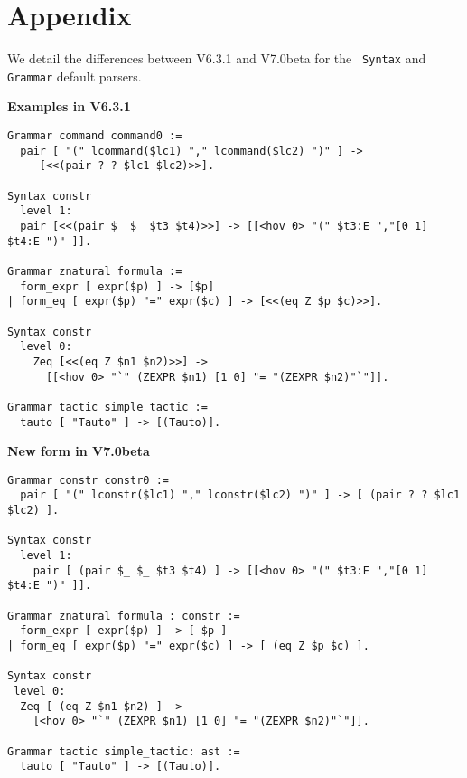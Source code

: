 \documentclass[11pt]{article}
\begin{document}
%
%

\section*{Appendix}
\label{Appendix}
We detail the differences between {\Coq} V6.3.1 and V7.0beta for the {\tt
Syntax} and {\tt Grammar} default parsers.

\medskip

{\bf Examples in V6.3.1}

\begin{verbatim}
Grammar command command0 :=
  pair [ "(" lcommand($lc1) "," lcommand($lc2) ")" ] ->
	 [<<(pair ? ? $lc1 $lc2)>>].

Syntax constr
  level 1:
  pair [<<(pair $_ $_ $t3 $t4)>>] -> [[<hov 0> "(" $t3:E ","[0 1] $t4:E ")" ]].

Grammar znatural formula :=
  form_expr [ expr($p) ] -> [$p]
| form_eq [ expr($p) "=" expr($c) ] -> [<<(eq Z $p $c)>>].

Syntax constr
  level 0:
    Zeq [<<(eq Z $n1 $n2)>>] -> 
      [[<hov 0> "`" (ZEXPR $n1) [1 0] "= "(ZEXPR $n2)"`"]].

Grammar tactic simple_tactic :=
  tauto [ "Tauto" ] -> [(Tauto)].
\end{verbatim}

\medskip

{\bf New form in V7.0beta}

\begin{verbatim}
Grammar constr constr0 :=
  pair [ "(" lconstr($lc1) "," lconstr($lc2) ")" ] -> [ (pair ? ? $lc1 $lc2) ].

Syntax constr
  level 1:
    pair [ (pair $_ $_ $t3 $t4) ] -> [[<hov 0> "(" $t3:E ","[0 1] $t4:E ")" ]].

Grammar znatural formula : constr :=
  form_expr [ expr($p) ] -> [ $p ]
| form_eq [ expr($p) "=" expr($c) ] -> [ (eq Z $p $c) ].

Syntax constr
 level 0:
  Zeq [ (eq Z $n1 $n2) ] -> 
    [<hov 0> "`" (ZEXPR $n1) [1 0] "= "(ZEXPR $n2)"`"]].

Grammar tactic simple_tactic: ast :=
  tauto [ "Tauto" ] -> [(Tauto)].
\end{verbatim}
\end{document}
